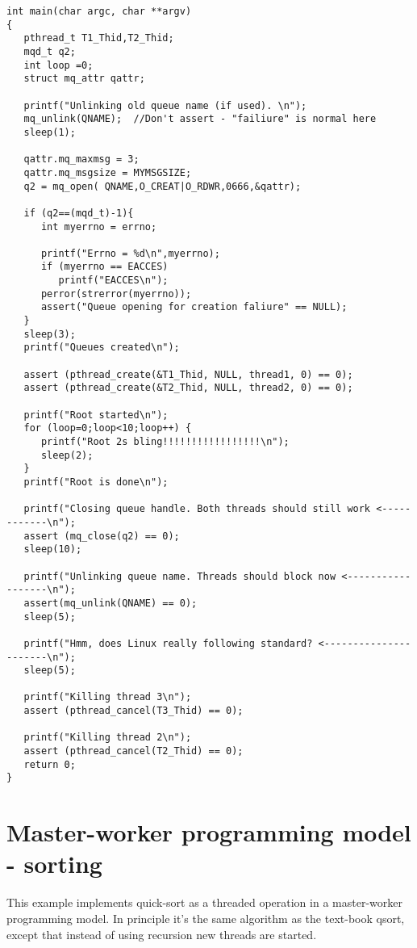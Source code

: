 \begin{table}[!hbp]
\begin{verbatim}
int main(char argc, char **argv)
{ 
   pthread_t T1_Thid,T2_Thid; 
   mqd_t q2;
   int loop =0;   
   struct mq_attr qattr;

   printf("Unlinking old queue name (if used). \n");  
   mq_unlink(QNAME);  //Don't assert - "failiure" is normal here
   sleep(1);

   qattr.mq_maxmsg = 3;
   qattr.mq_msgsize = MYMSGSIZE;
   q2 = mq_open( QNAME,O_CREAT|O_RDWR,0666,&qattr);  

   if (q2==(mqd_t)-1){      
      int myerrno = errno;

      printf("Errno = %d\n",myerrno);
      if (myerrno == EACCES)
         printf("EACCES\n");
      perror(strerror(myerrno)); 
      assert("Queue opening for creation faliure" == NULL); 
   }
   sleep(3);
   printf("Queues created\n"); 

   assert (pthread_create(&T1_Thid, NULL, thread1, 0) == 0); 
   assert (pthread_create(&T2_Thid, NULL, thread2, 0) == 0); 

   printf("Root started\n"); 
   for (loop=0;loop<10;loop++) {
      printf("Root 2s bling!!!!!!!!!!!!!!!!!\n");      
      sleep(2); 
   } 
   printf("Root is done\n");

   printf("Closing queue handle. Both threads should still work <------------\n");  
   assert (mq_close(q2) == 0);
   sleep(10);

   printf("Unlinking queue name. Threads should block now <------------------\n");    
   assert(mq_unlink(QNAME) == 0);
   sleep(5);

   printf("Hmm, does Linux really following standard? <----------------------\n");  
   sleep(5);

   printf("Killing thread 3\n");  
   assert (pthread_cancel(T3_Thid) == 0);

   printf("Killing thread 2\n");  
   assert (pthread_cancel(T2_Thid) == 0);
   return 0;
} 
\end{verbatim}
\caption{Main program - queues example.\label{q_main}}
\end{table}
\chapter{Master-worker programming model - sorting}
This example implements quick-sort as a threaded operation in a master-worker programming model. In principle it's the same algorithm as the text-book qsort, except that instead of using recursion new threads are started.

